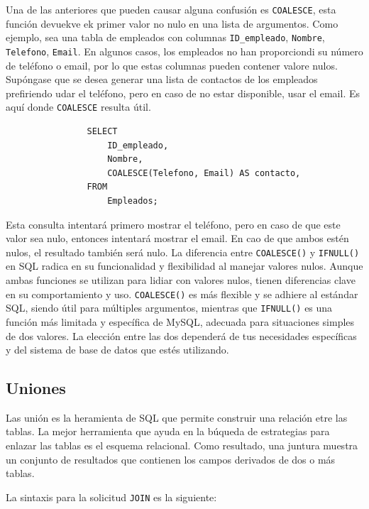             Una de las anteriores que pueden causar alguna confusión es \texttt{COALESCE}, esta función devuekve ek primer valor no nulo en una lista de argumentos. Como ejemplo, sea una tabla de empleados con columnas \texttt{ID\_empleado}, \texttt{Nombre}, \texttt{Telefono}, \texttt{Email}. En algunos casos, los empleados no han proporciondi su número de teléfono o email, por lo que estas columnas pueden contener valore nulos. Supóngase que se desea generar una lista de contactos de los empleados prefiriendo udar el teléfono, pero en caso de no estar disponible, usar el email. Es aquí donde \texttt{COALESCE} resulta útil.

            \begin{verbatim}
                SELECT
                    ID_empleado,
                    Nombre,
                    COALESCE(Telefono, Email) AS contacto,
                FROM
                    Empleados;
            \end{verbatim} 

            Esta consulta intentará primero mostrar el teléfono, pero en caso de que este valor sea nulo, entonces intentará mostrar el email. En cao de que ambos estén nulos, el resultado también será nulo. La diferencia entre \texttt{COALESCE()} y \texttt{IFNULL()} en SQL radica en su funcionalidad y flexibilidad al manejar valores nulos. Aunque ambas funciones se utilizan para lidiar con valores nulos, tienen diferencias clave en su comportamiento y uso. \texttt{COALESCE()} es más flexible y se adhiere al estándar SQL, siendo útil para múltiples argumentos, mientras que \texttt{IFNULL()} es una función más limitada y específica de MySQL, adecuada para situaciones simples de dos valores. La elección entre las dos dependerá de tus necesidades específicas y del sistema de base de datos que estés utilizando.

    \subsection{Uniones}

        Las unión es la heramienta de SQL que permite construir una relación etre las tablas. La mejor herramienta que ayuda en la búqueda de estrategias para enlazar las tablas es el esquema relacional. Como resultado, una juntura muestra un conjunto de resultados que contienen los campos derivados de dos o más tablas.

        La sintaxis para la solicitud \texttt{JOIN} es la siguiente:

